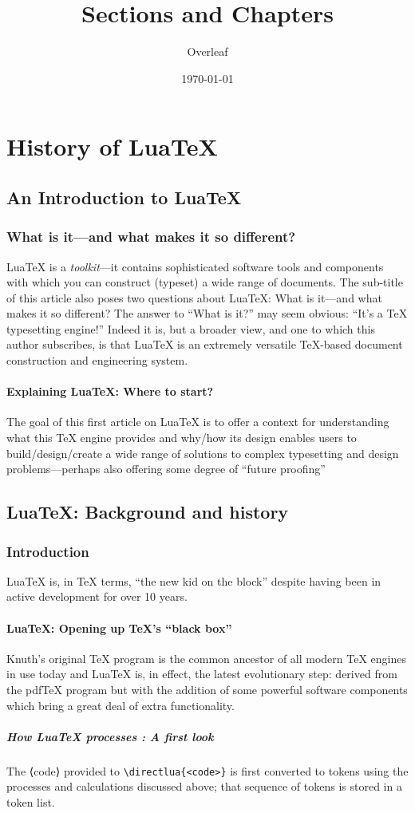 \documentclass{book}
\title{Sections and Chapters}
\author{Overleaf}
\date{\today}
\begin{document}
\maketitle
\tableofcontents
\part{History of Lua\TeX}

\chapter{An Introduction to Lua\TeX}

\section{What is it—and what makes it so different?}
Lua\TeX{} is a \textit{toolkit}—it contains sophisticated software tools and components with which you can construct (typeset) a wide range of documents. The sub-title of this article also poses two questions about Lua\TeX: What is it—and what makes it so different? The answer to “What is it?” may seem obvious: “It’s a \TeX{} typesetting engine!” Indeed it is, but a broader view, and one to which this author subscribes, is that Lua\TeX{} is an extremely versatile \TeX-based document construction and engineering system.

\subsection{Explaining Lua\TeX: Where to start?}
The goal of this first article on Lua\TeX{} is to offer a context for understanding what this TeX engine provides and why/how its design enables users to build/design/create a wide range of solutions to complex typesetting and design problems—perhaps also offering some degree of “future proofing” 

\chapter{Lua\TeX: Background and history}
\section{Introduction}
Lua\TeX{} is, in \TeX{} terms, “the new kid on the block” despite having been in active development for over 10 years.

\subsection{Lua\TeX: Opening up \TeX’s “black box”}
Knuth’s original \TeX{} program is the common ancestor of all modern \TeX{} engines in use today and Lua\TeX{} is, in effect, the latest evolutionary step: derived from the pdf\TeX{} program but with the addition of some powerful software components which bring a great deal of extra functionality.

\subsubsection{How Lua\TeX{} processes \texttt{\string\directlua}: A first look}
The ⟨code⟩ provided to \verb|\directlua{<code>}| is first converted to tokens using the processes and calculations discussed above; that sequence of tokens is stored in a token list.
\end{document}
